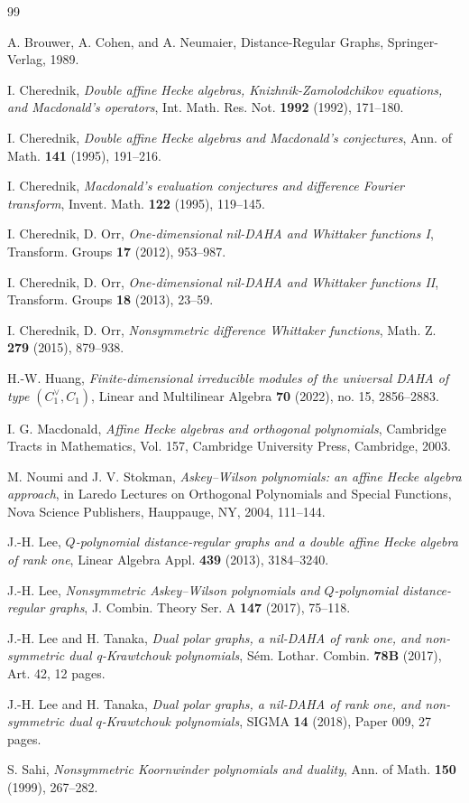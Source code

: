 \documentclass[reqno]{amsart}
\theoremstyle{definition}
\begin{document}
\begin{thebibliography}{99}

A. Brouwer, A. Cohen, and A. Neumaier, 
Distance-Regular Graphs, Springer-Verlag, 1989.

I. Cherednik, 
\emph{Double affine Hecke algebras, Knizhnik-Zamolodchikov equations, and Macdonald's operators},
Int. Math. Res. Not. \textbf{1992} (1992), 171--180.

I. Cherednik, 
\emph{Double affine Hecke algebras and Macdonald's conjectures}, 
Ann. of Math. \textbf{141} (1995), 191--216.

I. Cherednik, 
\emph{Macdonald's evaluation conjectures and difference Fourier transform}, 
Invent. Math. \textbf{122} (1995), 119--145.

I. Cherednik, D. Orr, 
\emph{One-dimensional nil-DAHA and Whittaker functions I}, 
Transform. Groups \textbf{17} (2012), 953--987.

I. Cherednik, D. Orr, 
\emph{One-dimensional nil-DAHA and Whittaker functions II}, 
Transform. Groups \textbf{18} (2013), 23--59.

I. Cherednik, D. Orr, 
\emph{Nonsymmetric difference Whittaker functions}, 
Math. Z. {\bf 279} (2015), 879--938.

H.-W. Huang,
\emph{Finite-dimensional irreducible modules of the universal DAHA of type $(C_1^\vee,C_1)$},
Linear and Multilinear Algebra \textbf{70} (2022), no. 15, 2856--2883.

I. G. Macdonald, 
\emph{Affine Hecke algebras and orthogonal polynomials}, 
Cambridge Tracts in Mathematics, Vol. 157, Cambridge University Press, Cambridge, 2003.

M. Noumi and J. V. Stokman,
\emph{Askey--Wilson polynomials: an affine Hecke algebra approach},
in Laredo Lectures on Orthogonal Polynomials and Special Functions,
Nova Science Publishers, Hauppauge, NY, 2004, 111--144.

J.-H. Lee, 
\emph{$Q$-polynomial distance-regular graphs and a double affine Hecke algebra of rank one}, 
Linear Algebra Appl. \textbf{439} (2013), 3184--3240.

J.-H. Lee, 
\emph{Nonsymmetric Askey--Wilson polynomials and $Q$-polynomial distance-regular graphs}, 
J. Combin. Theory Ser. A \textbf{147} (2017), 75--118.

J.-H. Lee and H. Tanaka,
\emph{Dual polar graphs, a nil-DAHA of rank one, and non-symmetric dual q-Krawtchouk
polynomials}, 
S\'em. Lothar. Combin. \textbf{78B} (2017), Art. 42, 12 pages.

J.-H. Lee and H. Tanaka,
\emph{Dual polar graphs, a nil-DAHA of rank one, and non-symmetric dual $q$-Krawtchouk polynomials},
SIGMA \textbf{14} (2018), Paper 009, 27 pages.

S. Sahi,
\emph{Nonsymmetric Koornwinder polynomials and duality}, 
Ann. of Math. \textbf{150} (1999), 267--282.

\end{thebibliography}
\end{document}

